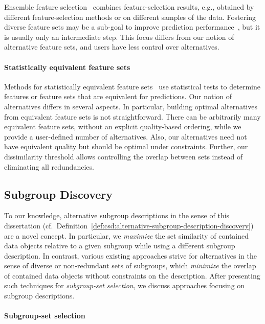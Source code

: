Ensemble feature selection~\cite{saeys2008robust, seijo2017ensemble} combines feature-selection results, e.g., obtained by different feature-selection methods or on different samples of the data.
Fostering diverse feature sets may be a sub-goal to improve prediction performance~\cite{guru2018alternative, liu2019subspace, shekar2017diverse, woznica2012model}, but it is usually only an intermediate step.
This focus differs from our notion of alternative feature sets, and users have less control over alternatives.

\paragraph{Statistically equivalent feature sets}

Methods for statistically equivalent feature sets~\cite{borboudakis2021extending, lagani2017feature} use statistical tests to determine features or feature sets that are equivalent for predictions.
Our notion of alternatives differs in several aspects.
In particular, building optimal alternatives from equivalent feature sets is not straightforward.
There can be arbitrarily many equivalent feature sets, without an explicit quality-based ordering, while we provide a user-defined number of alternatives.
Also, our alternatives need not have equivalent quality but should be optimal under constraints.
Further, our dissimilarity threshold allows controlling the overlap between sets instead of eliminating all redundancies.

\subsection{Subgroup Discovery}
\label{sec:related-work:alternatives:subgroup-discovery}

To our knowledge, alternative subgroup descriptions in the sense of this dissertation (cf.~Definition~\ref{def:csd:alternative-subgroup-description-discovery}) are a novel concept.
In particular, we \emph{maximize} the set similarity of contained data objects relative to a given subgroup while using a different subgroup description.
In contrast, various existing approaches strive for alternatives in the sense of diverse or non-redundant sets of subgroups, which \emph{minimize} the overlap of contained data objects without constraints on the description.
After presenting such techniques for \emph{subgroup-set selection}, we discuss approaches focusing on subgroup descriptions.

\paragraph{Subgroup-set selection}

